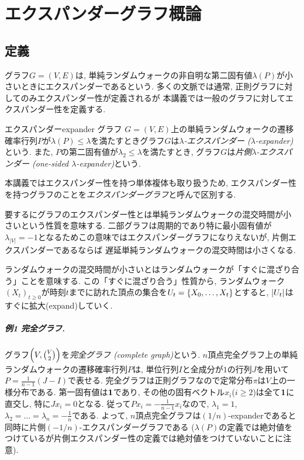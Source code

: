 \chapter{エクスパンダーグラフ概論} \label{chap:expander graph}
\section{定義}
グラフ$G=(V,E)$は, 単純ランダムウォークの非自明な第二固有値$\lambda(P)$が小さいときにエクスパンダーであるという.
多くの文脈では通常, 正則グラフに対してのみエクスパンダー性が定義されるが
本講義では一般のグラフに対してエクスパンダー性を定義する.
\begin{definition}{エクスパンダー}{expander}
    グラフ $G=(V,E)$上の単純ランダムウォークの遷移確率行列$P$が$\lambda(P) \le \lambda$を満たすときグラフ$G$は\emph{$\lambda$-エクスパンダー ($\lambda$-expander)}という.
    また, $P$の第二固有値が$\lambda_2 \le \lambda$を満たすとき, グラフ$G$は\emph{片側$\lambda$-エクスパンダー (one-sided $\lambda$-expander)}という.
\end{definition}
本講義ではエクスパンダー性を持つ単体複体も取り扱うため,
エクスパンダー性を持つグラフのことを\emph{エクスパンダーグラフ}と呼んで区別する.

要するにグラフのエクスパンダー性とは単純ランダムウォークの混交時間が小さいという性質を意味する.
二部グラフは周期的であり特に最小固有値が$\lambda_{|V|}=-1$となるためこの意味ではエクスパンダーグラフになりえないが,
片側エクスパンダーであるならば
遅延単純ランダムウォークの混交時間は小さくなる.

ランダムウォークの混交時間が小さいとはランダムウォークが「すぐに混ざり合う」ことを意味する.
この「すぐに混ざり合う」性質から, ランダムウォーク$(X_t)_{t\ge 0}$が時刻$t$までに訪れた頂点の集合を$U_t = \cbra*{X_0,\dots,X_t}$とすると, $\abs{U_t}$はすぐに拡大(expand)していく.

\paragraph*{例1 完全グラフ.}
グラフ$\rbra*{V, \binom{V}{2}}$を\emph{完全グラフ (complete graph)}という.
$n$頂点完全グラフ上の単純ランダムウォークの遷移確率行列$P$は, 単位行列$I$と全成分が$1$の行列$J$を用いて
$P = \frac{1}{n-1}(J-I)$で表せる.
完全グラフは正則グラフなので定常分布$\pi$は$V$上の一様分布である.
第一固有値は$\allone$であり,
その他の固有ベクトル$x_i$($i\ge 2$)は全て$\allone$に直交し, 特に$Jx_i = 0$となる.
従って$P x_i = -\frac{1}{n-1}x_i$なので, $\lambda_1=1$, $\lambda_2=\dots=\lambda_n = -\frac{1}{n}$である.
よって, $n$頂点完全グラフは$(1/n)$-expanderであると同時に片側$(-1/n)$-エクスパンダーグラフである
($\lambda(P)$の定義では絶対値をつけているが片側エクスパンダー性の定義では絶対値をつけていないことに注意).
%
